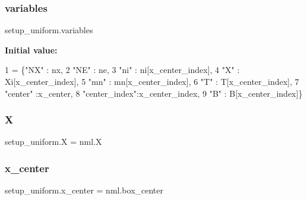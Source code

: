 \subsubsection{\texorpdfstring{variables}{variables}}
{\footnotesize\ttfamily setup\+\_\+uniform.\+variables}

{\bfseries Initial value\+:}
\begin{DoxyCode}
1 =  \{\textcolor{stringliteral}{"NX"}       : nx,
2              \textcolor{stringliteral}{"NE"}       : ne,
3              \textcolor{stringliteral}{"ni"}       : ni[x\_center\_index],
4              \textcolor{stringliteral}{"X"}        : Xi[x\_center\_index],
5              \textcolor{stringliteral}{"mn"}       : mn[x\_center\_index],
6              \textcolor{stringliteral}{"T"}        : T[x\_center\_index],
7              \textcolor{stringliteral}{"center"}   :x\_center,
8              \textcolor{stringliteral}{"center\_index"}:x\_center\_index,
9              \textcolor{stringliteral}{"B"}        : B[x\_center\_index]\}
\end{DoxyCode}
\mbox{\label{namespacesetup__uniform_a6d0e53624e475055c31146a2ff8d762c}} 
\subsubsection{\texorpdfstring{X}{X}}
{\footnotesize\ttfamily setup\+\_\+uniform.\+X = nml.\+X}

\mbox{\label{namespacesetup__uniform_add2270d3e0216b554470044218136714}} 
\subsubsection{\texorpdfstring{x\+\_\+center}{x\_center}}
{\footnotesize\ttfamily setup\+\_\+uniform.\+x\+\_\+center = nml.\+box\+\_\+center}

\mbox{\label{namespacesetup__uniform_a576b9dde3b8c37a63dfe5f4e77a99748}} 
